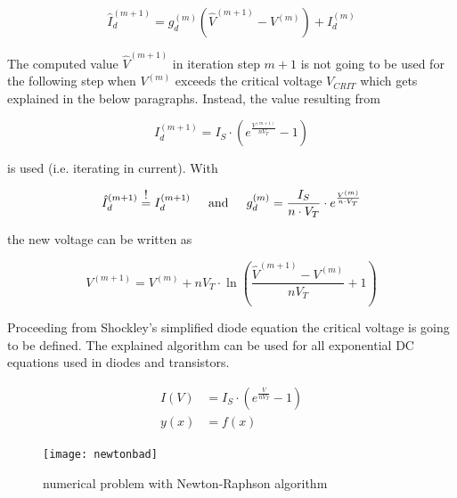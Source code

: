 \documentclass[10pt]{report}
\begin{document}
\begin{equation}
\hat{I}_{d}^{(m+1)} = g_{d}^{(m)} \left(\hat{V}^{(m+1)} - V^{(m)}\right) + I_{d}^{(m)}
\end{equation}

The computed value $\hat{V}^{(m+1)}$ in iteration step $m+1$ is not
going to be used for the following step when $V^{(m)}$ exceeds the
critical voltage $V_{CRIT}$ which gets explained in the below
paragraphs.  Instead, the value resulting from

\begin{equation}
I_{d}^{(m+1)} = I_{S}\cdot \left(e^{\frac{V^{(m+1)}}{n V_{T}}} - 1\right)
\end{equation}

is used (i.e. iterating in current).  With

\begin{equation}
\hat{I}_{d}^{(m+1)} \; \shortstack{!\\=} \; I_{d}^{(m+1)}
\;\;\;\; \text{ and } \;\;\;\;
g_{d}^{(m)} = \dfrac{I_{S}}{n\cdot V_{T}}\cdot e^{\frac{V^{(m)}}{n\cdot V_{T}}}
\end{equation}

the new voltage can be written as

\begin{equation}
V^{(m+1)} = V^{(m)} + n V_{T}\cdot \ln{\left(\dfrac{\hat{V}^{(m+1)} - V^{(m)}}{n V_{T}} + 1\right)}
\end{equation}

Proceeding from Shockley's simplified diode equation the critical
voltage is going to be defined.  The explained algorithm can be used
for all exponential DC equations used in diodes and transistors.

\begin{align}
I\left(V\right) &= I_{S}\cdot \left(e^{\frac{V}{n V_{T}}} - 1\right)
\label{eq:curve}\\
y\left(x\right) &= f \left(x\right)
\label{eq:explicit}
\end{align}

\begin{figure}[ht]
\begin{center}
\texttt{[image: newtonbad]}
\end{center}
\caption{numerical problem with Newton-Raphson algorithm}
\label{fig:NewtonBad}
\end{figure}
\FloatBarrier
\end{document}
